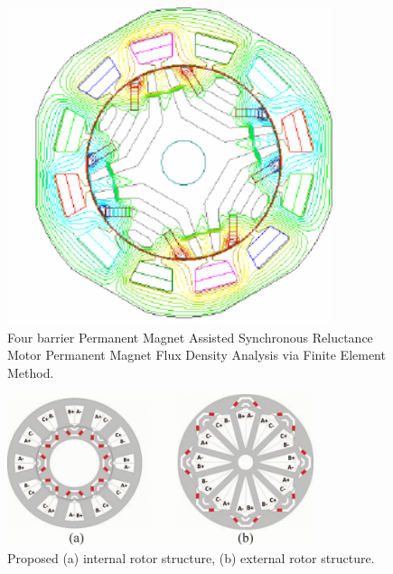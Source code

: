 \documentclass[a4paper, twoside, 11pt]{article}
\begin{document}
    \begin{minipage}[t]{0.45\textwidth}
        \begin{figure}[H]
            \centering
            \includegraphics[width=0.85\textwidth]{src/png/four-pole-rotor-fem.png}
            \caption{Four barrier Permanent Magnet Assisted Synchronous Reluctance Motor Permanent Magnet Flux Density Analysis via Finite Element Method. \cite{talebi-Design-of-Permanent-Magnet-Assisted-Synchronous-Reluctance-Motors-Made-Easy}}
            \label{fig:four-pole-rotor-fem}
        \end{figure}
    \end{minipage}%

    \begin{figure}[htbp!]
            \centering
            \includegraphics[width=0.8\textwidth]{src/png/external-internal-rotor.png}
            \caption{Proposed (a) internal rotor structure, (b) external rotor structure. \cite{bonthu-Design-of-permanent-magnet-assisted-synchronous-reluctance-motor-with-external-rotor-architecture}}
            \label{fig:external-internal-rotor}
    \end{figure}
\end{document}
